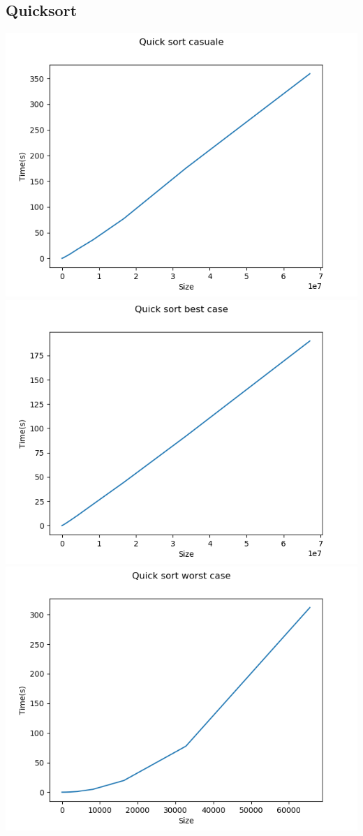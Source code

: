\documentclass[]{article}
\begin{document}
\subsection{Quicksort}
\begin{center}
\includegraphics[scale=0.5]{QuickSortCasuale}\\
\includegraphics[scale=0.5]{QuickSortBestCase}\\
\includegraphics[scale=0.5]{QuickSortWorstCase}\\
\end{center}
\end{document}
